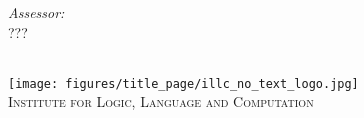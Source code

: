 \documentclass{report}
\newcommand{\red}[1]{{\color{red}{#1}}}
\begin{document}
{\begin{titlepage}
\begin{minipage}[t]{0.4\textwidth}
\begin{flushright} \large

\emph{Assessor:} \\

???


\end{flushright}

\end{minipage}\\[2cm]









\texttt{[image: figures/title\_page/illc\_no\_text\_logo.jpg]}\\ %

\textsc{\large Institute for Logic, Language and Computation}\\[1.0cm] %

 




\vfill %



\end{titlepage}
\clearpage
\restoregeometry
}


\doublespacing
\tableofcontents
\listoffigures
\listoftables
\listoffootnotes

% 

\newpage
\end{document}
